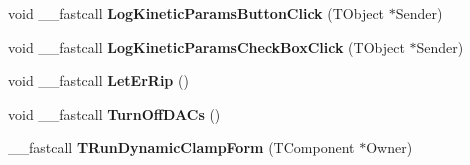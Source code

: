 \begin{DoxyCompactItemize}
\item 
\hypertarget{class_t_run_dynamic_clamp_form_a804dee7362b2d4d065934aca9da2e841}{void \+\_\+\+\_\+fastcall {\bfseries Log\+Kinetic\+Params\+Button\+Click} (T\+Object $\ast$Sender)}\label{class_t_run_dynamic_clamp_form_a804dee7362b2d4d065934aca9da2e841}

\item 
\hypertarget{class_t_run_dynamic_clamp_form_afbb21fc67bfdeb495e64dca3a361fdbb}{void \+\_\+\+\_\+fastcall {\bfseries Log\+Kinetic\+Params\+Check\+Box\+Click} (T\+Object $\ast$Sender)}\label{class_t_run_dynamic_clamp_form_afbb21fc67bfdeb495e64dca3a361fdbb}

\item 
\hypertarget{class_t_run_dynamic_clamp_form_a2a0e14a44c7c74c29b1d9db72f939aa6}{void \+\_\+\+\_\+fastcall {\bfseries Let\+Er\+Rip} ()}\label{class_t_run_dynamic_clamp_form_a2a0e14a44c7c74c29b1d9db72f939aa6}

\item 
\hypertarget{class_t_run_dynamic_clamp_form_a76474b91f11e255984ad2397d2a3011e}{void \+\_\+\+\_\+fastcall {\bfseries Turn\+Off\+D\+A\+Cs} ()}\label{class_t_run_dynamic_clamp_form_a76474b91f11e255984ad2397d2a3011e}

\item 
\hypertarget{class_t_run_dynamic_clamp_form_a652d649db6d173835084db9509f8b298}{\+\_\+\+\_\+fastcall {\bfseries T\+Run\+Dynamic\+Clamp\+Form} (T\+Component $\ast$Owner)}\label{class_t_run_dynamic_clamp_form_a652d649db6d173835084db9509f8b298}

\end{DoxyCompactItemize}
